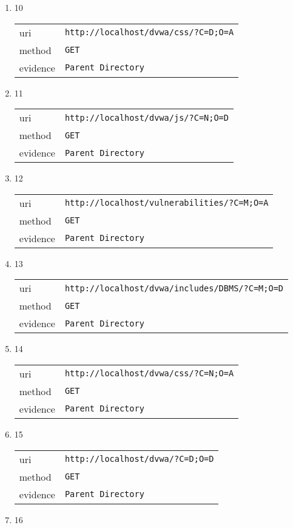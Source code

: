 \documentclass[10pt]{article}
\begin{document}
\begin{itemize}
\begin{enumerate}
\begin{tabular}{| l | p{12cm}}
\end{tabular}
\item[] 10
\begin{tabular}{| l | p{12cm}}
uri & \texttt{http://localhost/dvwa/css/?C=D;O=A} \\
method & \texttt{GET} \\
evidence & \texttt{Parent Directory} \\
\end{tabular}
\item[] 11
\begin{tabular}{| l | p{12cm}}
uri & \texttt{http://localhost/dvwa/js/?C=N;O=D} \\
method & \texttt{GET} \\
evidence & \texttt{Parent Directory} \\
\end{tabular}
\item[] 12
\begin{tabular}{| l | p{12cm}}
uri & \texttt{http://localhost/vulnerabilities/?C=M;O=A} \\
method & \texttt{GET} \\
evidence & \texttt{Parent Directory} \\
\end{tabular}
\item[] 13
\begin{tabular}{| l | p{12cm}}
uri & \texttt{http://localhost/dvwa/includes/DBMS/?C=M;O=D} \\
method & \texttt{GET} \\
evidence & \texttt{Parent Directory} \\
\end{tabular}
\item[] 14
\begin{tabular}{| l | p{12cm}}
uri & \texttt{http://localhost/dvwa/css/?C=N;O=A} \\
method & \texttt{GET} \\
evidence & \texttt{Parent Directory} \\
\end{tabular}
\item[] 15
\begin{tabular}{| l | p{12cm}}
uri & \texttt{http://localhost/dvwa/?C=D;O=D} \\
method & \texttt{GET} \\
evidence & \texttt{Parent Directory} \\
\end{tabular}
\item[] 16

\end{enumerate}
\end{itemize}
\end{document}
